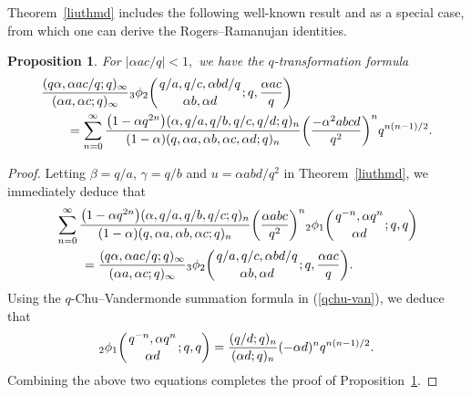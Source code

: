 \documentclass[10pt,a4paper]{amsart}
\numberwithin{equation}{section}
\newtheorem{Proposition}[Theorem]{Proposition}
 { \theoremstyle{definition}
\newtheorem{Definition}[Theorem]{Definition}
\newtheorem{Note}[Theorem]{Note}
\newtheorem{Example}[Theorem]{Example}
\newtheorem{Remark}[Theorem]{Remark} }
\begin{document}
Theorem~\ref{liuthmd} includes the following well-known result \cite[equation~(3.8.9)]{Gas+Rah} and \cite[Theorem~1.8]{Liu2013IJTN} as a special case, from which one can derive the Rogers--Ramanujan identities.
\begin{Proposition}\label{WRR} For $|\alpha ac/q|<1,$ we have the $q$-transformation formula
	\begin{align*}
		&\frac{(q\alpha, \alpha ac/q; q )_\infty}{(\alpha a, \alpha c; q )_\infty} {_3\phi_2} \biggl({{q/a, q/c, \alpha bd/q}\atop{\alpha b, \alpha d}}; q, \frac{\alpha ac}{q}\biggr)\\
		&\qquad{}=\sum_{n=0}^\infty \frac{\bigl(1-\alpha q^{2n}\bigr)(\alpha, q/a, q/b, q/c, q/d; q)_n}{(1-\alpha)(q, \alpha a, \alpha b, \alpha c, \alpha d; q)_n}\biggl(\frac{-\alpha^2 abcd}{q^2}\biggr)^n q^{n(n-1)/2}.
	\end{align*}	
\end{Proposition}
\begin{proof}
	Letting $\beta=q/a$, $\gamma=q/b$ and $u=\alpha abd/{q^2}$ in Theorem~\ref{liuthmd}, we immediately deduce that
	\begin{align*}
		&\sum_{n=0}^\infty \frac{\bigl(1-\alpha q^{2n}\bigr)(\alpha, q/a, q/b, q/c; q)_n}{(1-\alpha)(q, \alpha a, \alpha b, \alpha c; q)_n}\biggl(\frac{\alpha abc}{q^2}\biggr)^n {_2\phi_1}\biggl({{q^{-n}, \alpha q^n}
			\atop{\alpha d}}; q, q\biggr)\\
		&\qquad{}=\frac{(q\alpha, \alpha ac/q; q )_\infty}{(\alpha a, \alpha c; q )_\infty} {_3\phi_2} \biggl({{q/a, q/c, \alpha bd/q}\atop{\alpha b, \alpha d}}; q, \frac{\alpha ac}{q}\biggr).
	\end{align*}
	Using the $q$-Chu--Vandermonde summation formula in (\ref{qchu-van}), we deduce that
	\[
	{_2\phi_1}\biggl({{q^{-n}, \alpha q^n}
		\atop{\alpha d}}; q, q\biggr)=\frac{(q/d; q)_n}{(\alpha d; q)_n}
	(-\alpha d)^n q^{n(n-1)/2}.
	\]
	Combining the above two equations completes the proof of Proposition~\ref{WRR}.
\end{proof}
\end{document}
